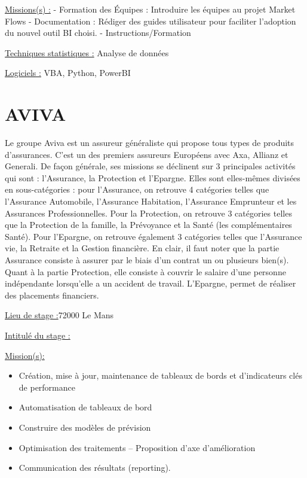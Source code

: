 \documentclass[
  letterpaper,
  DIV=11,
  numbers=noendperiod]{scrreprt}
\begin{document}
\uline{Missions(s) :} - Formation des Équipes : Introduire les équipes
au projet Market Flows - Documentation : Rédiger des guides utilisateur
pour faciliter l'adoption du nouvel outil BI choisi. -
Instructions/Formation

\uline{Techniques statistiques :} Analyse de données

\uline{Logiciels :} VBA, Python, PowerBI

\hypertarget{aviva}{%
\section{\texorpdfstring{\textbf{AVIVA}}{AVIVA}}\label{aviva}}

Le groupe Aviva est un assureur généraliste qui propose tous types de
produits d'assurances. C'est un des premiers assureurs Européens avec
Axa, Allianz et Generali. De façon générale, ses missions se déclinent
sur 3 principales activités qui sont : l'Assurance, la Protection et
l'Epargne. Elles sont elles-mêmes divisées en sous-catégories : pour
l'Assurance, on retrouve 4 catégories telles que l'Assurance Automobile,
l'Assurance Habitation, l'Assurance Emprunteur et les Assurances
Professionnelles. Pour la Protection, on retrouve 3 catégories telles
que la Protection de la famille, la Prévoyance et la Santé (les
complémentaires Santé). Pour l'Epargne, on retrouve également 3
catégories telles que l'Assurance vie, la Retraite et la Gestion
financière. En clair, il faut noter que la partie Assurance consiste à
assurer par le biais d'un contrat un ou plusieurs bien(s). Quant à la
partie Protection, elle consiste à couvrir le salaire d'une personne
indépendante lorsqu'elle a un accident de travail. L'Epargne, permet de
réaliser des placements financiers.

\uline{Lieu de stage :}72000 Le Mans

\uline{Intitulé du stage :}

\uline{Mission(s):}

\begin{itemize}
\item
  Création, mise à jour, maintenance de tableaux de bords et
  d'indicateurs clés de performance
\item
  Automatisation de tableaux de bord
\item
  Construire des modèles de prévision
\item
  Optimisation des traitements -- Proposition d'axe d'amélioration
\item
  Communication des résultats (reporting).
\end{itemize}
\end{document}
